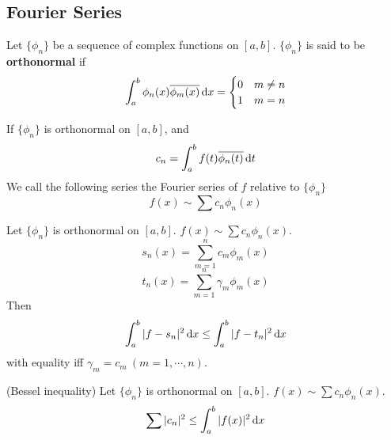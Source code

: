     \subsection{Fourier Series}
    \begin{defi}
        Let $\{ \phi_n \}$ be a sequence of complex functions on $[a,b]$. $\{ \phi_n \}$ is said to be \textbf{orthonormal} if 
        \begin{equation}
            \int_a^b \phi_n(x) \overline{\phi_m(x)} \mathop{}\!\mathrm{d} x = \begin{cases}
                0 & m \neq n \\
                1 & m = n
            \end{cases}
        \end{equation}

        If $\{ \phi_n \}$ is orthonormal on $[a,b]$, and
        \begin{equation}
            c_n = \int_a^b f(t) \overline{\phi_n(t)} \mathop{}\!\mathrm{d} t
        \end{equation}
        We call the following series the Fourier series of $f$ relative to $\{ \phi_n \}$
        \begin{equation}
            f(x) \sim \sum c_n \phi_n (x)
        \end{equation}
    \end{defi}

    \begin{theo}
        Let $\{ \phi_n \}$ is orthonormal on $[a,b]$. $f(x) \sim \sum c_n \phi_n (x)$.
        \begin{equation}
            s_n(x) = \sum_{m=1}^n c_m \phi_m (x)
        \end{equation}
        \begin{equation}
            t_n(x) = \sum_{m=1}^n \gamma_m \phi_m (x)
        \end{equation}
        Then
        \begin{equation}
            \int_a^b | f-s_n |^2 \mathop{}\!\mathrm{d} x \leq \int_a^b | f-t_n |^2 \mathop{}\!\mathrm{d} x
        \end{equation}
        with equality iff $\gamma_m = c_m \ (m=1,\cdots,n)$.
    \end{theo}

    \begin{theo}
        (Bessel inequality) Let $\{ \phi_n \}$ is orthonormal on $[a,b]$. $f(x) \sim \sum c_n \phi_n (x)$.
        \begin{equation}
            \sum |c_n|^2 \leq \int_a^b |f(x)|^2 \mathop{}\!\mathrm{d} x
        \end{equation}
    \end{theo}
